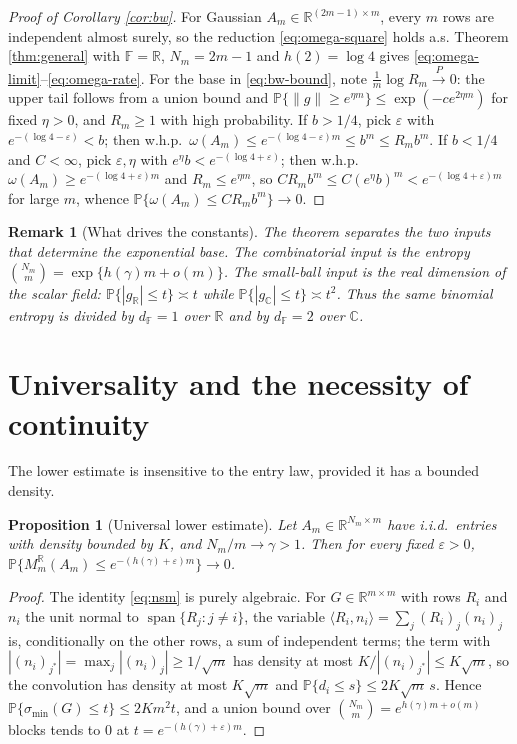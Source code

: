 \documentclass[preprint,12pt]{elsarticle}
\newtheorem{proposition}[theorem]{Proposition}
\newtheorem{remark}[theorem]{Remark}
\newcommand{\R}{\mathbb{R}}
\newcommand{\C}{\mathbb{C}}
\newcommand{\F}{\mathbb{F}}
\newcommand{\PP}{\mathbb{P}}
\begin{document}
\begin{proof}[Proof of Corollary \ref{cor:bw}]
For Gaussian $A_m\in\R^{(2m-1)\times m}$, every $m$ rows are independent almost surely, so the
reduction \eqref{eq:omega-square} holds a.s. Theorem \ref{thm:general} with $\F=\R$, $N_m=2m-1$ and
$h(2)=\log4$ gives \eqref{eq:omega-limit}--\eqref{eq:omega-rate}. For the base in \eqref{eq:bw-bound},
note $\frac1m\log R_m\xrightarrow{P}0$: the upper tail follows from a union bound and
$\PP\{\|g\|\ge e^{\eta m}\}\le \exp(-c e^{2\eta m})$ for fixed $\eta>0$, and $R_m\ge1$ with high
probability. If $b>1/4$, pick $\varepsilon$ with $e^{-(\log4-\varepsilon)}<b$; then w.h.p.\
$\omega(A_m)\le e^{-(\log4-\varepsilon)m}\le b^m\le R_m b^m$. If $b<1/4$ and $C<\infty$, pick
$\varepsilon,\eta$ with $e^\eta b<e^{-(\log4+\varepsilon)}$; then w.h.p.\
$\omega(A_m)\ge e^{-(\log4+\varepsilon)m}$ and $R_m\le e^{\eta m}$, so $CR_m b^m\le C(e^\eta b)^m
<e^{-(\log4+\varepsilon)m}$ for large $m$, whence $\PP\{\omega(A_m)\le CR_m b^m\}\to0$.
\end{proof}

\begin{remark}[What drives the constants]
The theorem separates the two inputs that determine the exponential base. The combinatorial input is
the entropy $\binom{N_m}{m}=\exp\{h(\gamma)m+o(m)\}$. The small-ball input is the real dimension of the
scalar field: $\PP\{|g_\R|\le t\}\asymp t$ while $\PP\{|g_\C|\le t\}\asymp t^2$. Thus the same binomial
entropy is divided by $d_\F=1$ over $\R$ and by $d_\F=2$ over $\C$.
\end{remark}

\section{Universality and the necessity of continuity}\label{sec:universal}

The lower estimate is insensitive to the entry law, provided it has a bounded density.

\begin{proposition}[Universal lower estimate]\label{prop:universal}
Let $A_m\in\R^{N_m\times m}$ have i.i.d.\ entries with density bounded by $K$, and $N_m/m\to\gamma>1$.
Then for every fixed $\varepsilon>0$, $\PP\{M_m^\R(A_m)\le e^{-(h(\gamma)+\varepsilon)m}\}\to0$.
\end{proposition}

\begin{proof}
The identity \eqref{eq:nsm} is purely algebraic. For $G\in\R^{m\times m}$ with rows $R_i$ and $n_i$ the
unit normal to $\operatorname{span}\{R_j:j\ne i\}$, the variable $\langle R_i,n_i\rangle=\sum_j (R_i)_j
(n_i)_j$ is, conditionally on the other rows, a sum of independent terms; the term with
$|(n_i)_{j^\ast}|=\max_j|(n_i)_j|\ge1/\sqrt m$ has density at most $K/|(n_i)_{j^\ast}|\le K\sqrt m$, so
the convolution has density at most $K\sqrt m$ and $\PP\{d_i\le s\}\le 2K\sqrt m\,s$. Hence
$\PP\{\sigma_{\min}(G)\le t\}\le 2Km^2 t$, and a union bound over $\binom{N_m}{m}=e^{h(\gamma)m+o(m)}$
blocks tends to $0$ at $t=e^{-(h(\gamma)+\varepsilon)m}$.
\end{proof}
\end{document}
